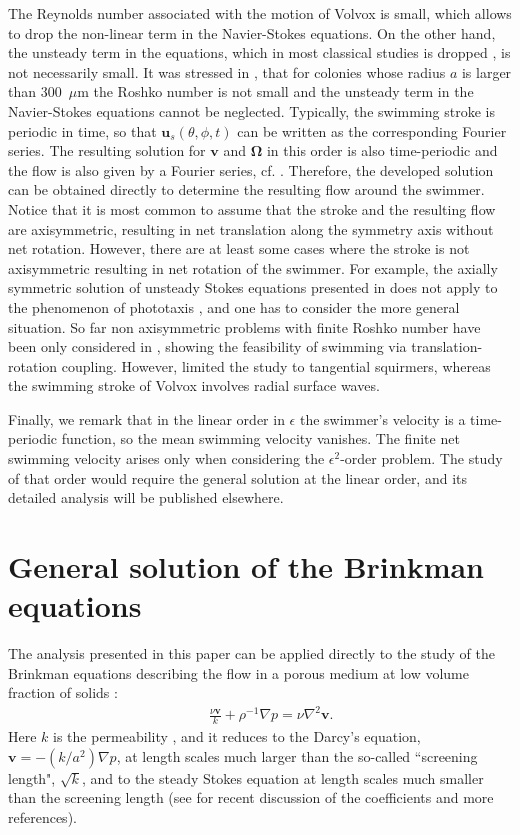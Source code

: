 \documentclass[aps,prx,twocolumn,amsmath,amssymb,amsfonts]{revtex4-2}
\begin{document}
{{The Reynolds number associated with the motion of Volvox is small, which allows to drop the non-linear term in the Navier-Stokes equations. On the other hand, the unsteady term in the equations, which in most classical studies is dropped \cite{lighthill}, is not necessarily small. It was stressed in \cite{for}, that for colonies whose radius $a$ is larger than $300$~$\mu$m the Roshko number is not small and the unsteady term in the Navier-Stokes equations cannot be neglected. Typically, the swimming stroke is periodic in time, so that $\bm u_s(\theta, \phi, t)$ can be written as the corresponding Fourier series. The resulting solution for $\bm v$ and $\bm \Omega$ in this order is also time-periodic and the flow is also given by a Fourier series, cf. \cite{Ishimoto}. Therefore, the developed solution
can be obtained directly to determine the resulting flow around the swimmer. Notice that it is most common to assume that the stroke and the resulting flow are axisymmetric, resulting in net translation along the symmetry axis without net rotation. However, there are at least some cases where the stroke is not axisymmetric resulting in net rotation of the swimmer. For example, the axially symmetric solution of unsteady Stokes equations presented in \cite{Ishimoto} does not apply to the phenomenon of phototaxis \cite{photo}, and one has to consider the more general situation. So far non axisymmetric problems with finite Roshko number have been only considered in \cite{for}, showing the feasibility of swimming via translation-rotation coupling. However, \cite{for} limited the study to tangential squirmers, whereas the swimming stroke of Volvox involves radial surface waves.

Finally, we remark that in the linear order in $\epsilon$ the swimmer's velocity is a time-periodic function, so the mean swimming velocity vanishes. The finite net swimming velocity arises only when considering the $\epsilon^2$-order problem. The study of that order would require the general solution at the linear order, and its detailed analysis will be published elsewhere.


\section{General solution of the Brinkman equations} \label{unBr}

The analysis presented in this paper can be applied directly to the study of the Brinkman equations describing the flow in a porous medium at low volume fraction of solids \cite{r,dru}:
\begin{eqnarray}&&\!\!\!\!
\frac{\nu \bm v }{k}+\rho^{-1} \nabla p=\nu\nabla^2\bm v.
\end{eqnarray}
Here $k$ is the permeability \cite{r}, and it reduces to the Darcy's equation, $\bm v=-(k/a^2)\nabla p$, at length scales much larger than the so-called ``screening length", $\sqrt{k}$, and to the steady Stokes equation at length scales much smaller than the screening length (see \cite{modl} for recent discussion of the coefficients and more references).

}}
\end{document}
